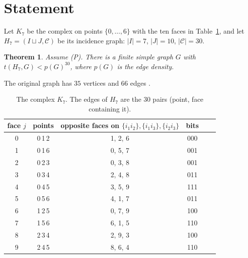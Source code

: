 \documentclass[11pt]{amsart}
\newtheorem{theorem}{Theorem}[section]
\theoremstyle{definition}
\theoremstyle{remark}
\newcommand{\1}{\mathbf 1}
\begin{document}
\section{Statement}
Let $K_7$ be the complex on points $\{0,\dots,6\}$ with the ten faces in Table~\ref{tab:k7}, and let
$H_7=(I\sqcup J,\mathscr C)$ be its incidence graph: $|I|=7$, $|J|=10$, $|\mathscr C|=30$.
\begin{theorem}\label{thm:main}
Assume (P). There is a finite simple graph $G$ with $t(H_7,G)<p(G)^{30}$, where $p(G)$ is the edge density.
\end{theorem}
The original graph has $35$ vertices and $66$ edges \cite[Thm.~1.1]{oai}.

\begin{table}[h]\small
\begin{tabular}{cccccc}
\toprule
face $j$ & points & opposite faces on $\{i_1i_2\},\{i_1i_3\},\{i_2i_3\}$ & bits\\
\midrule
0&0\,1\,2&1, 2, 6&000\\ 1&0\,1\,6&0, 5, 7&001\\ 2&0\,2\,3&0, 3, 8&001\\ 3&0\,3\,4&2, 4, 8&011\\
4&0\,4\,5&3, 5, 9&111\\ 5&0\,5\,6&4, 1, 7&011\\ 6&1\,2\,5&0, 7, 9&100\\ 7&1\,5\,6&6, 1, 5&110\\
8&2\,3\,4&2, 9, 3&100\\ 9&2\,4\,5&8, 6, 4&110\\
\bottomrule
\end{tabular}
\caption{The complex $K_7$. The edges of $H_7$ are the $30$ pairs (point, face containing it).}
\label{tab:k7}
\end{table}
\end{document}
